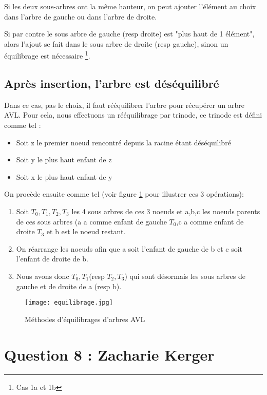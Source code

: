 \documentclass[10pt,a4paper]{article}
\begin{document}
Si les deux sous-arbres ont la même hauteur, on peut ajouter l'élément au choix dans l'arbre de gauche ou dans l'arbre de droite.

Si par contre le sous arbre de gauche (resp droite) est "plus haut de 1 élément", alors l'ajout se fait dans le sous arbre de droite (resp gauche), sinon un équilibrage est nécessaire \footnote{Cas 1a et 1b}.
\subsection*{Après insertion, l'arbre est déséquilibré}
Dans ce cas, pas le choix, il faut rééquilibrer l'arbre pour récupérer un arbre AVL. Pour cela, nous effectuons un rééquilibrage par trinode, ce trinode est défini comme tel :
\begin{itemize}
\item Soit z le premier noeud rencontré depuis la racine étant déséquilibré
\item Soit y le plus haut enfant de z
\item Soit x le plus haut enfant de y
\end{itemize}
On procède ensuite comme tel (voir figure \ref{avleq} pour illustrer ces 3 opérations):
\begin{enumerate}

\item Soit $T_0,T_1,T_2,T_3$ les 4 sous arbres de ces 3 noeuds et a,b,c les noeuds parents de ces sous arbres (a a comme enfant de gauche $T_0$,c a comme enfant de droite $T_3$ et b est le noeud restant.
\item On réarrange les noeuds afin que a soit l'enfant de gauche de b et c soit l'enfant de droite de b.
\item Nous avons donc $T_0,T_1$(resp $T_2,T_3$) qui sont désormais les sous arbres de gauche et de droite de a (resp b).
\end{enumerate}
\begin{figure}[!h]
\centering
\texttt{[image: equilibrage.jpg]}
\caption{Méthodes d'équilibrages d'arbres AVL}
\label{avleq}
\end{figure}



\section*{Question 8 : Zacharie Kerger}
\end{document}
